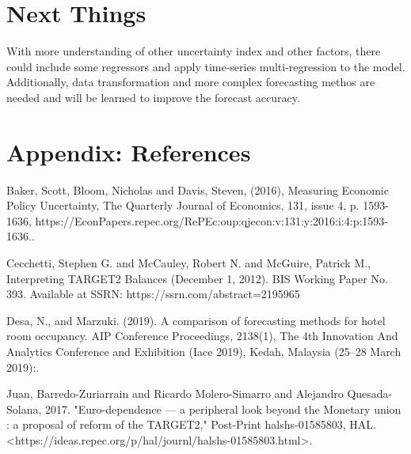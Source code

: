 \documentclass[12pt]{article}
\begin{document}
\section{Next Things}

With more understanding of other uncertainty index and other factors, there could include some regressors and apply time-series multi-regression to the model. Additionally, data transformation and more complex forecasting methos are needed and will be learned to improve the forecast accuracy. 


\singlespacing
\setlength\bibsep{0pt}



\clearpage

\onehalfspacing

\section*{Appendix: References} \label{sec:references}

Baker, Scott, Bloom, Nicholas and Davis, Steven, (2016), Measuring Economic Policy Uncertainty, The Quarterly Journal of Economics, 131, issue 4, p. 1593-1636, https://EconPapers.repec.org/RePEc:oup:qjecon:v:131:y:2016:i:4:p:1593-1636..

Cecchetti, Stephen G. and McCauley, Robert N. and McGuire, Patrick M., Interpreting TARGET2 Balances (December 1, 2012). BIS Working Paper No. 393. Available at SSRN: https://ssrn.com/abstract=2195965 

Desa, N., and Marzuki. (2019). A comparison of forecasting methods for hotel room occupancy. AIP Conference Proceedings, 2138(1), The 4th Innovation And Analytics Conference and Exhibition (Iace 2019), Kedah, Malaysia (25–28 March 2019):.

Juan, Barredo-Zuriarrain and Ricardo Molero-Simarro and Alejandro Quesada-Solana, 2017. "Euro-dependence — a peripheral look beyond the Monetary union : a proposal of reform of the TARGET2," Post-Print halshs-01585803, HAL. <https://ideas.repec.org/p/hal/journl/halshs-01585803.html>. 
\end{document}
